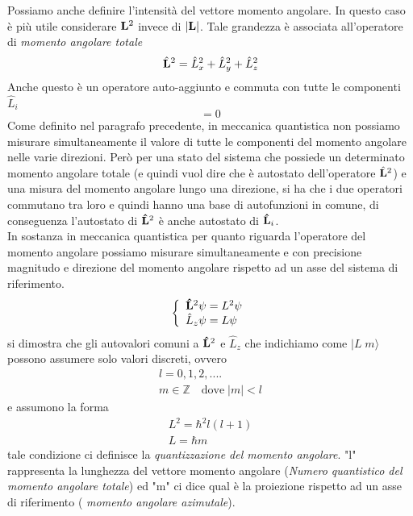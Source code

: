 Possiamo anche definire l'intensit\`a del vettore momento angolare. In questo caso \`e pi\`u utile considerare $\bold{L}^2$ invece di $|\bold{L}|$. Tale grandezza \`e associata all'operatore di \textit{momento angolare totale}
\begin{equation*}
	\hat{\bold{L}}^2 = \hat{L}_{x}^2 + \hat{L}_{y}^2+ \hat{L}_{z}^2
\end{equation*}
Anche questo \`e un operatore auto-aggiunto e commuta con tutte le componenti $\hat{L}_{i}$
\begin{equation*}
	[\hat{\bold{L}}^2,L_i] = 0
\end{equation*}
Come definito nel paragrafo precedente, in meccanica quantistica non possiamo misurare simultaneamente il valore di tutte le componenti del momento angolare nelle varie direzioni. Per\`o per una stato del sistema che possiede un determinato momento angolare totale (e quindi vuol dire che \`e autostato dell'operatore $\hat{\bold{L}}^2$) e una misura del momento angolare lungo una direzione, si ha che i due operatori commutano tra loro e quindi hanno una base di autofunzioni in comune, di conseguenza l'autostato di $\bold{\hat{L}}^2$ \`e anche autostato di $\bold{\hat{L}}_i$. 
\\
In sostanza in meccanica quantistica per quanto riguarda l'operatore del momento angolare possiamo misurare simultaneamente e con precisione magnitudo e direzione del momento angolare rispetto ad un asse del sistema di riferimento.
\begin{equation}
	\left \{\begin{array}{l}
		\bold{\hat{L}}^2 \psi = L^2\psi \\
		\hat{L}_z\psi = L \psi
	\end{array}\right.
\end{equation}  
si dimostra che gli autovalori comuni a $\bold{\hat{L}}^2$ e $\hat{L}_z$  che indichiamo come $\mid L \;m \rangle$ possono assumere solo valori discreti, ovvero
\begin{equation*}
	\begin{aligned}
		& l = 0,1,2,.... & \\
		& m \in \mathbb{Z} \quad \text{dove} \; |m| < l
	\end{aligned}
\end{equation*}
e assumono la forma
\begin{equation*}
	\begin{aligned}
		& L^2 = \hbar^2 l(l+1) & \\
		& L = \hbar m
	\end{aligned}
\end{equation*}
tale condizione ci definisce la \textit{quantizzazione del momento angolare}. "l" rappresenta la lunghezza del vettore momento angolare (\textit{Numero quantistico del momento angolare totale}) ed "m" ci dice qual \`e la proiezione rispetto ad un asse di riferimento ( \textit{momento angolare azimutale}).

